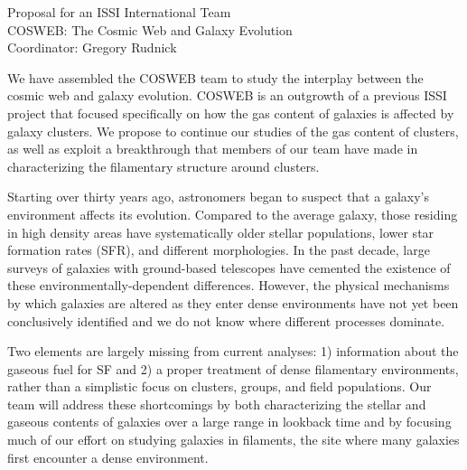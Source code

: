 \documentclass[11pt]{article}
\newcommand{\HRule}{\rule{\linewidth}{0.3mm}}
\begin{document}






\begin{center}
\large{Proposal for an ISSI International Team}\\
\Large{COSWEB: The Cosmic Web and Galaxy Evolution}\\
\medskip
\vspace{-0.2cm}
\large{Coordinator: Gregory Rudnick}\\
\end{center}
We have assembled the COSWEB team to study the interplay between the cosmic web and galaxy evolution. COSWEB is an outgrowth of a previous ISSI project that focused specifically on how the gas content of galaxies is affected by galaxy clusters. We propose to continue our studies of the gas content of clusters, as well as exploit a breakthrough that members of our team have made in characterizing the filamentary structure around clusters.

Starting over thirty years ago, astronomers began to suspect that a galaxy's environment affects its evolution.  Compared to the average galaxy, those residing in high density areas have systematically older stellar populations, lower star formation rates (SFR), and  different morphologies.  In the past decade, large surveys of galaxies with ground-based telescopes have cemented the existence of these environmentally-dependent differences. However, the physical mechanisms by which galaxies are altered as they enter dense environments have not yet been conclusively identified and we do not know where different processes dominate.

Two elements are largely missing from current analyses: 1) information about the gaseous fuel for SF and 2) a proper treatment of dense filamentary environments, rather than a simplistic focus on clusters, groups, and field populations. Our team will address these shortcomings by both characterizing the stellar and gaseous contents of galaxies over a large range in lookback time and by focusing much of our effort on studying galaxies in filaments, the site where many galaxies first encounter a dense environment.
\end{document}
